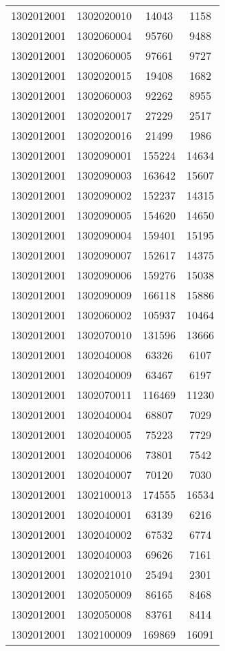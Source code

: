 \begin{longtable}[h]{llcc}
		1302012001 & 1302020010 & 14043 & 1158\\
		1302012001 & 1302060004 & 95760 & 9488\\
		1302012001 & 1302060005 & 97661 & 9727\\
		1302012001 & 1302020015 & 19408 & 1682\\
		1302012001 & 1302060003 & 92262 & 8955\\
		1302012001 & 1302020017 & 27229 & 2517\\
		1302012001 & 1302020016 & 21499 & 1986\\
		1302012001 & 1302090001 & 155224 & 14634\\
		1302012001 & 1302090003 & 163642 & 15607\\
		1302012001 & 1302090002 & 152237 & 14315\\
		1302012001 & 1302090005 & 154620 & 14650\\
		1302012001 & 1302090004 & 159401 & 15195\\
		1302012001 & 1302090007 & 152617 & 14375\\
		1302012001 & 1302090006 & 159276 & 15038\\
		1302012001 & 1302090009 & 166118 & 15886\\
		1302012001 & 1302060002 & 105937 & 10464\\
		1302012001 & 1302070010 & 131596 & 13666\\
		1302012001 & 1302040008 & 63326 & 6107\\
		1302012001 & 1302040009 & 63467 & 6197\\
		1302012001 & 1302070011 & 116469 & 11230\\
		1302012001 & 1302040004 & 68807 & 7029\\
		1302012001 & 1302040005 & 75223 & 7729\\
		1302012001 & 1302040006 & 73801 & 7542\\
		1302012001 & 1302040007 & 70120 & 7030\\
		1302012001 & 1302100013 & 174555 & 16534\\
		1302012001 & 1302040001 & 63139 & 6216\\
		1302012001 & 1302040002 & 67532 & 6774\\
		1302012001 & 1302040003 & 69626 & 7161\\
		1302012001 & 1302021010 & 25494 & 2301\\
		1302012001 & 1302050009 & 86165 & 8468\\
		1302012001 & 1302050008 & 83761 & 8414\\
		1302012001 & 1302100009 & 169869 & 16091\\

\end{longtable}

